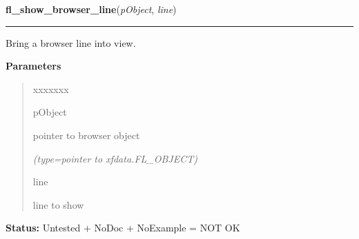 \hspace{.8\funcindent}\begin{boxedminipage}{\funcwidth}

    \raggedright \textbf{fl\_show\_browser\_line}(\textit{pObject}, \textit{line})

    \vspace{-1.5ex}

    \rule{\textwidth}{0.5\fboxrule}
\setlength{\parskip}{2ex}
    Bring a browser line into view.

\setlength{\parskip}{1ex}
      \textbf{Parameters}
      \vspace{-1ex}

      \begin{quote}
        \begin{Ventry}{xxxxxxx}

          \item[pObject]

          pointer to browser object

            {\it (type=pointer to xfdata.FL\_OBJECT)}

          \item[line]

          line to show

        \end{Ventry}

      \end{quote}

\textbf{Status:} Untested + NoDoc + NoExample = NOT OK



    \end{boxedminipage}

    \label{xformslib:library:fl_set_browser_hscroll_callback}

    \vspace{0.5ex}

